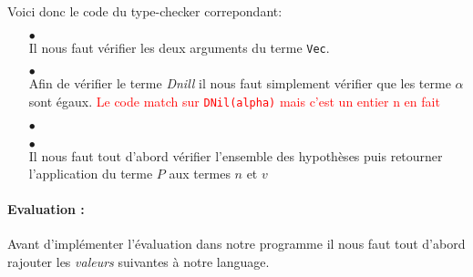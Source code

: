 \documentclass {article}
\newcommand{\codefrom}[3]
           {}
\theoremstyle{definition}
\theoremstyle{remark}
\newcommand{\todo}[1]{\textcolor{red}{#1}}
\newcommand{\fun}[1]{\lstinline!#1!}
\begin{document}
Voici donc le code du type-checker correpondant:
\begin{itemize}
  
\item[$\bullet$] \\
  
  Il nous faut vérifier les deux arguments du terme \fun{Vec}.
  \codefrom{dependent}{lambda}{check_vec}

  
\item[$\bullet$] \\
  Afin de vérifier le terme \emph{Dnill} il nous faut simplement vérifier que les terme $\alpha$
  sont égaux.  \todo{Le code match sur \fun{DNil(alpha)} mais c'est un entier n en fait}
  \codefrom{dependent}{lambda}{check_dnil}

\item[$\bullet$] \\
  \codefrom{dependent}{lambda}{check_dcons}


\item[$\bullet$] \\
  Il nous faut tout d'abord vérifier l'ensemble des hypothèses puis retourner l'application du terme $P$
  aux termes $n$ et $v$
  \codefrom{dependent}{lambda}{synth_dfold}

    
\end{itemize}




\paragraph{Evaluation :} 
Avant d'implémenter l'évaluation dans notre programme il nous faut tout d'abord
rajouter les \emph{valeurs} suivantes à notre language.
\codefrom{dependent}{lambda}{Value_Vector}
\end{document}
